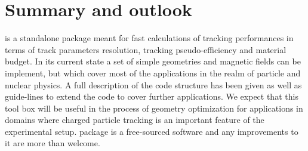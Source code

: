 \section{Summary and outlook}
\label{sec:Summary}

{\guari} is a standalone package meant for fast calculations of tracking performances in terms of track parameters resolution, tracking pseudo-efficiency and material budget.
In its current state a set of simple geometries and magnetic fields can be implement, but which cover most of the applications in the realm of particle and nuclear physics.
A full description of the code structure has been given as well as guide-lines to extend the code to cover further applications. We expect that this tool box will be useful in 
the process of geometry optimization for applications in domains where charged particle tracking is an important feature of the experimental setup. {\guari} package is a free-sourced 
software and any improvements to it are more than welcome.





